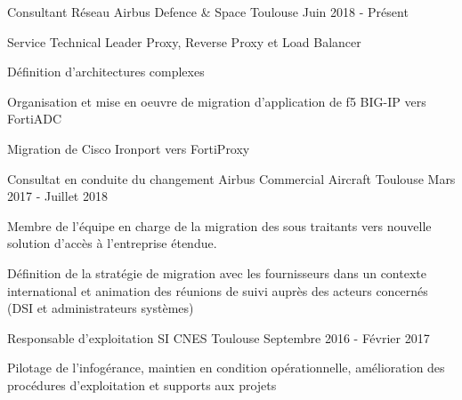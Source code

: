 

\begin{cventries}

  \cventry
    {Consultant Réseau} %
    {Airbus Defence \& Space} %
    {Toulouse} %
    {Juin 2018 - Présent} %
    {
      \begin{cvitems} %
        \item {Service Technical Leader Proxy, Reverse Proxy et Load Balancer}
        \item {Définition d'architectures complexes}
        \item {Organisation et mise en oeuvre de migration d'application de f5 BIG-IP vers FortiADC}
        \item {Migration de Cisco Ironport vers FortiProxy}
      \end{cvitems}
    }

  \cventry
    {Consultat en conduite du changement} %
    {Airbus Commercial Aircraft} %
    {Toulouse} %
    {Mars 2017 - Juillet 2018} %
    {
      \begin{cvdoubleitems} %
        \item {Membre de l'équipe en charge de la migration des sous traitants vers nouvelle solution d'accès à l'entreprise étendue.}
        \item {Définition de la stratégie de migration avec les fournisseurs dans un contexte international et animation des réunions de suivi auprès des acteurs concernés (DSI et administrateurs systèmes)}
      \end{cvdoubleitems}
    }

  \cventry
    {Responsable d'exploitation SI} %
    {CNES} %
    {Toulouse} %
    {Septembre 2016 - Février 2017} %
    {
      \begin{cvitems} %
        \item {Pilotage de l'infogérance, maintien en condition opérationnelle, amélioration des procédures d'exploitation et supports aux projets}
      \end{cvitems}
    }
    

\end{cventries}
